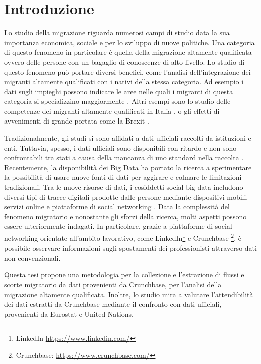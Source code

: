 \chapter*{Introduzione}
Lo studio della migrazione riguarda numerosi campi di studio data la sua importanza economica, sociale e per lo sviluppo di nuove politiche. Una categoria di questo fenomeno in particolare è quella della migrazione altamente qualificata ovvero delle persone con un bagaglio di conoscenze di alto livello.
Lo studio di questo fenomeno può portare diversi benefici, come l'analisi dell'integrazione dei migranti altamente qualificati con i nativi della stessa categoria. Ad esempio i dati sugli impieghi possono indicare le aree nelle quali i migranti di questa categoria si specializzino maggiormente \cite{KerrSalriOzden, PeriSharber}. Altri esempi sono lo studio delle competenze dei migranti altamente qualificati in Italia \cite{impicciatore2021emigrazione}, o  gli effetti di avvenimenti di grande portata come la Brexit \cite{doi.org/10.1111/manc.12356}.

Tradizionalmente, gli studi si sono affidati a dati ufficiali raccolti da istituzioni e enti. 
Tuttavia, spesso, i dati ufficiali sono disponibili con ritardo e non sono confrontabili tra stati a causa della mancanza di uno standard nella raccolta \cite{deBeer2010, poulain2006thesim}. 
Recentemente, la disponibilità dei Big Data ha portato la ricerca a sperimentare la possibilità di usare nuove fonti di dati per aggirare e colmare le limitazioni tradizionali. 
Tra le nuove risorse di dati, i cosiddetti social-big data includono diversi tipi di tracce digitali prodotte dalle persone mediante dispositivi mobili, servizi online e piattaforme di social networking \cite{sirbu2021human}. 
Data la complessità del fenomeno migratorio e nonostante gli sforzi della ricerca, molti aspetti possono essere ulteriormente indagati. 
In particolare, grazie a piattaforme di social networking orientate all'ambito lavorativo, come LinkedIn\footnote{LinkedIn \url{https://www.linkedin.com/}} e Crunchbase \footnote{Crunchbase: \url{https://www.crunchbase.com/}}, è possibile osservare informazioni sugli spostamenti dei professionisti attraverso dati non convenzionali. 

Questa tesi propone una metodologia per la collezione e l'estrazione di flussi e scorte migratorio da dati provenienti da Crunchbase, per l'analisi della migrazione altamente qualificata. Inoltre, lo studio mira a valutare l'attendibilità dei dati estratti da Crunchbase mediante il confronto con dati ufficiali, provenienti da Eurostat e United Nations. 




